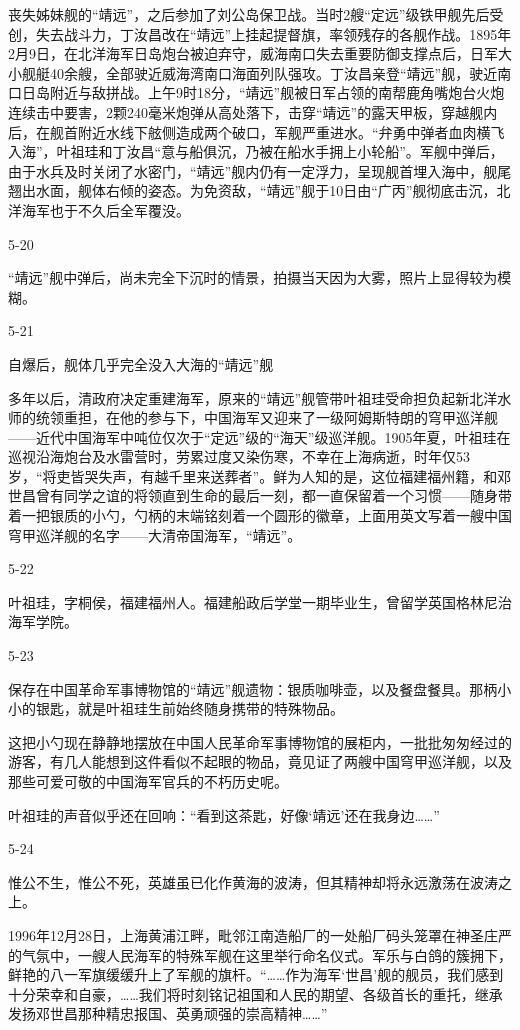\documentclass[12pt,UTF8]{ctexbook}
\begin{document}
丧失姊妹舰的“靖远”，之后参加了刘公岛保卫战。当时2艘“定远”级铁甲舰先后受创，失去战斗力，丁汝昌改在“靖远”上挂起提督旗，率领残存的各舰作战。1895年2月9日，在北洋海军日岛炮台被迫弃守，威海南口失去重要防御支撑点后，日军大小舰艇40余艘，全部驶近威海湾南口海面列队强攻。丁汝昌亲登“靖远”舰，驶近南口日岛附近与敌拼战。上午9时18分，“靖远”舰被日军占领的南帮鹿角嘴炮台火炮连续击中要害，2颗240毫米炮弹从高处落下，击穿“靖远”的露天甲板，穿越舰内后，在舰首附近水线下舷侧造成两个破口，军舰严重进水。“弁勇中弹者血肉横飞入海”，叶祖珪和丁汝昌“意与船俱沉，乃被在船水手拥上小轮船”。军舰中弹后，由于水兵及时关闭了水密门，“靖远”舰内仍有一定浮力，呈现舰首埋入海中，舰尾翘出水面，舰体右倾的姿态。为免资敌，“靖远”舰于10日由“广丙”舰彻底击沉，北洋海军也于不久后全军覆没。

5-20

“靖远”舰中弹后，尚未完全下沉时的情景，拍摄当天因为大雾，照片上显得较为模糊。

5-21

自爆后，舰体几乎完全没入大海的“靖远”舰

多年以后，清政府决定重建海军，原来的“靖远”舰管带叶祖珪受命担负起新北洋水师的统领重担，在他的参与下，中国海军又迎来了一级阿姆斯特朗的穹甲巡洋舰——近代中国海军中吨位仅次于“定远”级的“海天”级巡洋舰。1905年夏，叶祖珪在巡视沿海炮台及水雷营时，劳累过度又染伤寒，不幸在上海病逝，时年仅53岁，“将吏皆哭失声，有越千里来送葬者”。鲜为人知的是，这位福建福州籍，和邓世昌曾有同学之谊的将领直到生命的最后一刻，都一直保留着一个习惯——随身带着一把银质的小勺，勺柄的末端铭刻着一个圆形的徽章，上面用英文写着一艘中国穹甲巡洋舰的名字——大清帝国海军，“靖远”。

5-22

叶祖珪，字桐侯，福建福州人。福建船政后学堂一期毕业生，曾留学英国格林尼治海军学院。

5-23

保存在中国革命军事博物馆的“靖远”舰遗物：银质咖啡壶，以及餐盘餐具。那柄小小的银匙，就是叶祖珪生前始终随身携带的特殊物品。

这把小勺现在静静地摆放在中国人民革命军事博物馆的展柜内，一批批匆匆经过的游客，有几人能想到这件看似不起眼的物品，竟见证了两艘中国穹甲巡洋舰，以及那些可爱可敬的中国海军官兵的不朽历史呢。

叶祖珪的声音似乎还在回响：“看到这茶匙，好像‘靖远’还在我身边……”

5-24

惟公不生，惟公不死，英雄虽已化作黄海的波涛，但其精神却将永远激荡在波涛之上。

1996年12月28日，上海黄浦江畔，毗邻江南造船厂的一处船厂码头笼罩在神圣庄严的气氛中，一艘人民海军的特殊军舰在这里举行命名仪式。军乐与白鸽的簇拥下，鲜艳的八一军旗缓缓升上了军舰的旗杆。“……作为海军‘世昌’舰的舰员，我们感到十分荣幸和自豪，……我们将时刻铭记祖国和人民的期望、各级首长的重托，继承发扬邓世昌那种精忠报国、英勇顽强的崇高精神……”
\end{document}
